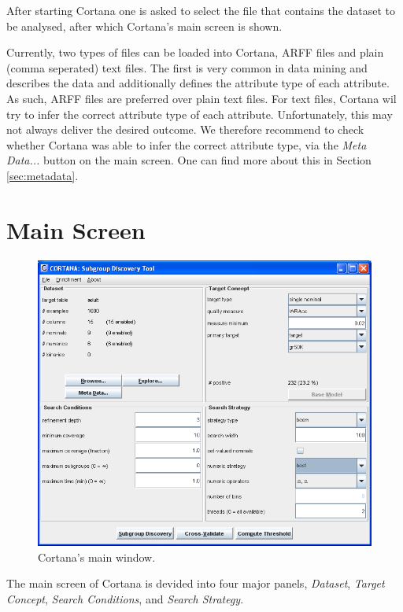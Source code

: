 \documentclass{article}
\begin{document}
After starting Cortana one is asked to select the file that contains the dataset to be analysed, after which Cortana's main screen is shown.

Currently, two types of files can be loaded into Cortana, ARFF files and plain (comma seperated) text files.
The first is very common in data mining and describes the data and additionally defines the attribute type of each attribute.
As such, ARFF files are preferred over plain text files.
For text files, Cortana wil try to infer the correct attribute type of each attribute.
Unfortunately, this may not always deliver the desired outcome. 
We therefore recommend to check
whether Cortana was able to infer the correct attribute type, via the \emph{Meta Data...} button on the main screen. One can find more about this in Section \ref{sec:metadata}.

\section{Main Screen}

\begin{figure}
\begin{center}
\includegraphics[width=\textwidth]{mainwindow.png}
\caption{Cortana's main window.}
\label{fig:mainwindow}
\end{center}
\end{figure}

The main screen of Cortana is devided into four major panels, \emph{Dataset}, \emph{Target Concept}, \emph{Search Conditions}, and \emph{Search Strategy}.
\end{document}

